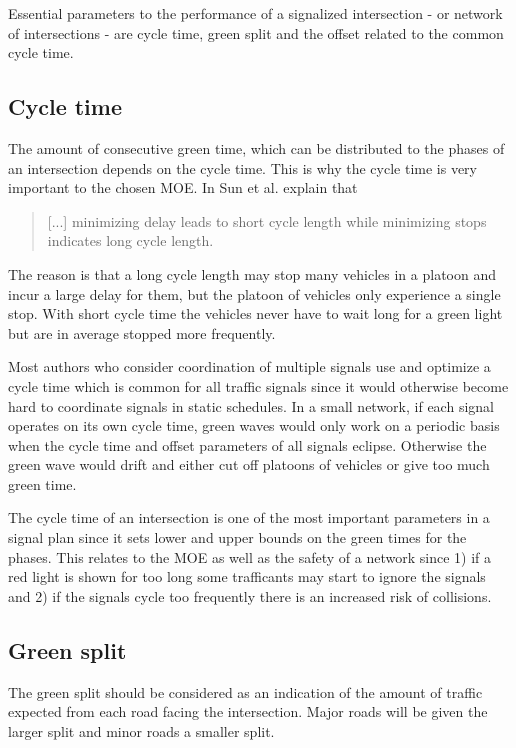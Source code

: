 \label{theproblem}
Essential parameters to the performance of a signalized intersection - or network of intersections - are cycle time, green split and the offset related to the common cycle time.

\subsection*{Cycle time}
The amount of consecutive green time, which can be distributed to the phases of an intersection depends on the cycle time. This is why the cycle time is very important to the chosen MOE. In \cite{41} Sun et al. explain that 

\begin{quote}[...] minimizing delay leads to short cycle length while minimizing stops indicates long cycle length.
\end{quote}

The reason is that a long cycle length may stop many vehicles in a platoon and incur a large delay for them, but the platoon of vehicles only experience a single stop. With short cycle time the vehicles never have to wait long for a green light but are in average stopped more frequently.

Most authors who consider coordination of multiple signals use and optimize a cycle time which is common for all traffic signals since it would otherwise become hard to coordinate signals in static schedules. In a small network, if each signal operates on its own cycle time, green waves would only work on a periodic basis when the cycle time and offset parameters of all signals eclipse. Otherwise the green wave would drift and either cut off platoons of vehicles or give too much green time.

The cycle time of an intersection is one of the most important parameters in a signal plan since it sets  lower and upper bounds on the green times for the phases. This relates to the MOE as well as the safety of a network since 1) if a red light is shown for too long some trafficants may start to ignore the signals and 2) if the signals cycle too frequently there is an increased risk of collisions.

\subsection*{Green split}
The green split should be considered as an indication of the amount of traffic expected from each road facing the intersection. Major roads will be given the larger split and minor roads a smaller split.

